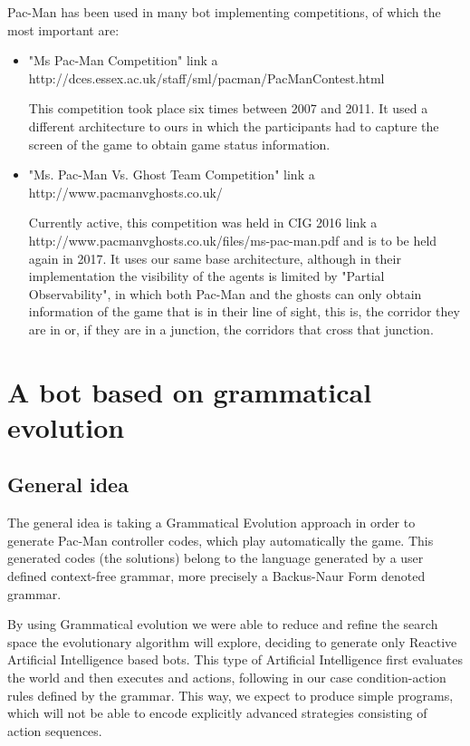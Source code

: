 \documentclass{llncs}
\newcommand{\paco}{Pac-Man }
\begin{document}
\paco has been used in many bot implementing competitions, of which the most important are:

\begin{itemize}
\setlength{\itemindent}{-.3cm}
\item "Ms Pac-Man Competition"{\color{red} link a http://dces.essex.ac.uk/staff/sml/pacman/PacManContest.html}

This competition took place six times between 2007 and 2011. It used a different architecture to ours in which the participants had to capture the screen of the game to obtain game status information. 
\item "Ms. Pac-Man Vs. Ghost Team Competition"{\color{red} link a http://www.pacmanvghosts.co.uk/}

Currently active, this competition was held in CIG 2016{\color{red} link a http://www.pacmanvghosts.co.uk/files/ms-pac-man.pdf} and is to be held again in 2017. It uses our same base architecture, although in their implementation the visibility of the agents is limited by "Partial Observability", in which both \paco and the ghosts can only obtain information of the game that is in their line of sight, this is, the corridor they are in or, if they are in a junction, the corridors that cross that junction.
\end{itemize}


%
\section{A bot based on grammatical evolution}
\label{sec:sec1}
%

\subsection{General idea}

The general idea is taking a Grammatical Evolution approach in order to generate \paco controller codes, which play automatically the game. This generated codes (the solutions) belong to the language generated by a user defined context-free grammar, more precisely a Backus-Naur Form denoted grammar. 

By using Grammatical evolution we were able to reduce and refine the search space the evolutionary algorithm will explore, deciding to generate only Reactive Artificial Intelligence based bots. This type of Artificial Intelligence first evaluates the world and then executes and actions, following in our case condition-action rules defined by the grammar. This way, we expect to produce simple programs, which will not be able to encode explicitly advanced strategies consisting of action sequences.
\end{document}
